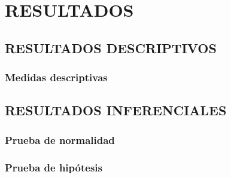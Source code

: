 \chapter{RESULTADOS}


\section{RESULTADOS DESCRIPTIVOS}

\lipsum[1]

\subsection{Medidas descriptivas}

\lipsum[2]


\section{RESULTADOS INFERENCIALES}

\lipsum[3]

\subsection{Prueba de normalidad}

\lipsum[4]

\subsection{Prueba de hipótesis}

\lipsum[5]

